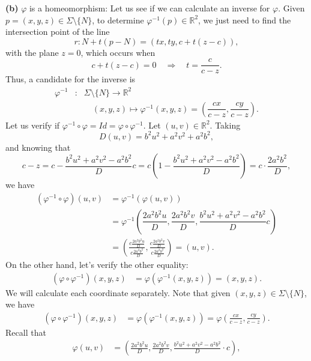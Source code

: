 \documentclass{amsart}
\theoremstyle{plain}
\numberwithin{equation}{section}
\begin{document}
\noindent\textbf{(b)} \( \varphi \) is a homeomorphism: Let us see if we can calculate an inverse for \( \varphi \). Given
\( p = (x,y,z) \in \Sigma \setminus \{N\} \), to determine $ \varphi^{-1}(p) \in \mathbb{R}^2$, we just need to find the intersection point of the line
$$
r: N + t(p - N) = (tx, ty, c + t(z - c)),
$$
with the plane \( z = 0 \), which occurs when
$$
c + t(z - c) = 0 \quad \Longrightarrow \quad t = \frac{c}{c - z}.
$$
Thus, a candidate for the inverse is
\begin{equation}\label{inversa_elipsoide}
	\begin{array}{rcl}
		\varphi^{-1} & : & \Sigma \setminus \{N \} \longrightarrow  \mathbb{R}^2 \\
		&  & \quad (x,y,z) \longmapsto \varphi^{-1}(x,y,z) = \left( \dfrac{cx}{c-z}, \dfrac{cy}{c - z} \right).
	\end{array}
\end{equation}
Let us verify if \( \varphi^{-1} \circ \varphi = Id = \varphi \circ \varphi^{-1} \). Let \( (u,v) \in \mathbb{R}^2 \). Taking 
\[ D(u,v) = b^2u^2 + a^2v^2 + a^2b^2, \] 
and knowing that
\begin{equation}\label{c-z}
	c - z = c - \frac{b^2u^2 + a^2v^2 - a^2b^2}{D}c
	= c \left( 1 - \frac{b^2u^2 + a^2v^2 - a^2b^2}{D} \right)
	= c \cdot \frac{2a^2b^2}{D},
\end{equation}
we have
\begin{align*}
	(\varphi^{-1} \circ \varphi)(u,v) &= \varphi^{-1}(\varphi(u,v)) \\
	&= \varphi^{-1}\left(  \dfrac{2a^2 b^2 u}{D} , \dfrac{2a^2 b^2 v}{D} , \dfrac{b^2 u^2 + a^2 v^2 - a^2 b^2}{D} c \right) \\
	&= \left( \frac{c\frac{2a^2b^2u}{D}}{c\frac{2a^2b^2}{D}}, \frac{c\frac{2a^2b^2v}{D}}{c\frac{2a^2b^2}{D}} \right) = (u,v).
\end{align*}
On the other hand, let's verify the other equality:
\begin{align*}
	(\varphi \circ \varphi^{-1})(x,y,z) &= \varphi(\varphi^{-1}(x,y,z)) = (x,y,z).
\end{align*}
We will calculate each coordinate separately. Note that given \( (x,y,z) \in \Sigma \setminus \{N\} \), we have
\begin{align*}
	(\varphi \circ \varphi^{-1})(x,y,z) &= \varphi(\varphi^{-1}(x,y,z)) = \varphi\left( \frac{cx}{c - z}, \frac{cy}{c - z} \right).
\end{align*}
Recall that
\begin{align*}
	\varphi(u,v) &= \left( \frac{2a^2b^2u}{D}, \frac{2a^2b^2v}{D}, \frac{b^2u^2 + a^2v^2 - a^2b^2}{D} \cdot c \right),
\end{align*}
\end{document}
